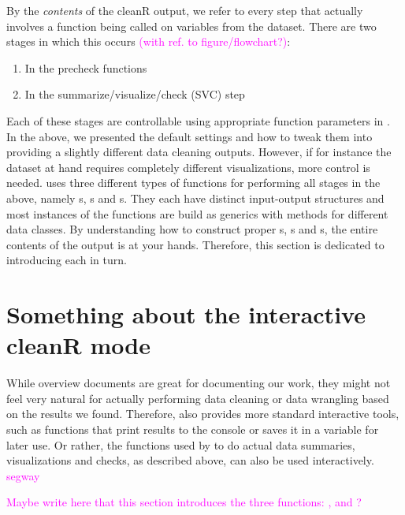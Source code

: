 \documentclass[article]{jss}
\newcommand{\hl}[1]{\textcolor{magenta}{#1}}
\newcommand{\R}[1]{\code{#1}}
\begin{document}
By the \textit{contents} of the cleanR output, we refer to every step that actually involves a function being called on variables from the dataset. There are two stages in which this occurs \hl{(with ref. to figure/flowchart?)}:
\begin{enumerate}
\item In the precheck functions
\item In the summarize/visualize/check (SVC) step
\end{enumerate}
Each of these stages are controllable using appropriate function parameters in . In the above, we presented the default  settings and how to tweak them into providing a slightly different data cleaning outputs. However, if for instance the dataset at hand requires completely different visualizations, more control is needed.  uses three different types of functions for performing all stages in the above, namely s, s and s. They each have distinct input-output structures and most instances of the functions are build as  generics with methods for different data classes. By understanding how to construct proper s, s and s, the entire contents of the  output is at your hands. Therefore, this section is dedicated to introducing each in turn.\\



\section{Something about the interactive cleanR mode}
While overview documents are great for documenting our work, they might not feel very natural for actually performing data cleaning or data wrangling based on the results we found. Therefore, \R{cleanR} also provides more standard \R{R} interactive tools, such as functions that print results to the console or saves it in a variable for later use. Or rather, the functions used by \R{clean()} to do actual data summaries, visualizations and checks, as described above, can also be used interactively. \hl{segway}

\hl{Maybe write here that this section introduces the three functions: \R{summarize()}, \R{check()} and \R{visualize()}?} 
\end{document}
